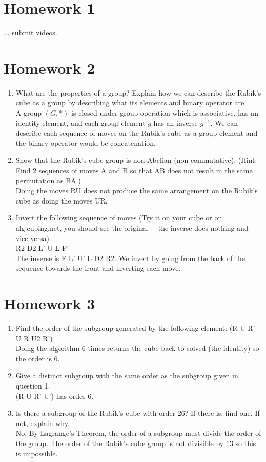 \documentclass[11pt]{article}
\author{\Name, SID \SID}
\date{}
\begin{document}
\section{Homework 1}
... submit videos.
\section{Homework 2}
\begin{enumerate}
    \item What are the properties of a group? Explain how we can describe the Rubik's cube as a group by describing what its elements and binary operator are. \\
    A group $(G, *)$ is closed under group operation which is associative, has an identity element, and each group element $g$ has an inverse $g^{-1}.$ We can describe each sequence of moves on the Rubik's cube as a group element and the binary operator would be concatenation.
    \item Show that the Rubik's cube group is non-Abelian (non-commutative). (Hint: Find 2 sequences of moves A and B so that AB does not result in the same permutation as BA.) \\
    Doing the moves RU does not produce the same arrangement on the Rubik's cube as doing the moves UR.
    \item Invert the following sequence of moves (Try it on your cube or on alg.cubing.net, you should see the original + the inverse does nothing and vice versa).\\
    R2 D2 L' U L F'\\
    The inverse is F L' U' L D2 R2. We invert by going from the back of the sequence towards the front and inverting each move.
\end{enumerate}

\newpage
\section{Homework 3}
\begin{enumerate}
    \item Find the order of the subgroup generated by the following element: (R U R' U R U2 R') \\
    Doing the algorithm 6 times returns the cube back to solved (the identity) so the order is 6.
    \item Give a distinct subgroup with the same order as the subgroup given in question 1. \\
    (R U R' U') has order 6. 
    \item Is there a subgroup of the Rubik's cube with order 26? If there is, find one. If not, explain why. \\
    No. By Lagrange's Theorem, the order of a subgroup must divide the order of the group. The order of the Rubik's cube group is not divisible by 13 so this is impossible.
\end{enumerate}
\end{document}
